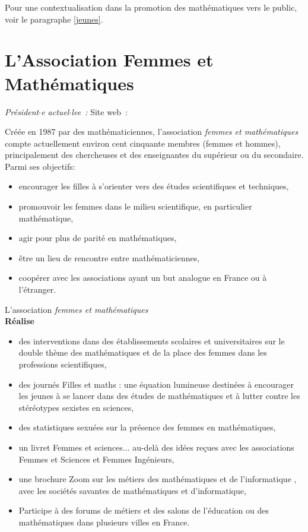 Pour une contextualisation dans la promotion des math\'ematiques vers le public, voir le paragraphe \ref{jeunes}.\\




\section{L'Association Femmes et Math\'ematiques}

\emph{Pr\'esident$\cdot$e actuel$\cdot$lee~: } \hfill Site web~: 
\smallskip

Cr\'e\'ee en 1987 par des math\'ematiciennes, l'association \textit{femmes et math\'ematiques} compte actuellement environ cent cinquante membres (femmes et hommes), principalement des chercheuses et des enseignantes du sup\'erieur ou du secondaire. \\
Parmi ses objectifs:
\begin{itemize}
\item encourager les filles \`a s'orienter vers des \'etudes scientifiques et techniques,
\item promouvoir les femmes dans le milieu scientifique, en particulier math\'ematique,
\item agir pour plus de parit\'e en math\'ematiques,
\item \^etre un lieu de rencontre entre math\'ematiciennes,
\item coop\'erer avec les associations ayant un but analogue en France ou \`a l'\'etranger.
\end{itemize}

L'association \textit{femmes et math\'ematiques} \\
\textbf{R\'ealise}
\begin{itemize}
\item  des interventions dans des \'etablissements scolaires et universitaires sur le double th\`eme des math\'ematiques et de la place des femmes dans les professions scientifiques,
\item des journ\'es \og Filles et maths : une \'equation lumineuse  \fg destin\'ees \`a encourager les jeunes \`a se lancer dans des \'etudes de math\'ematiques et \`a lutter contre les st\'er\'eotypes sexistes en sciences,
\item des statistiques sexu\'ees sur la pr\'esence des femmes en math\'ematiques,
\item un livret \og Femmes et sciences... au-del\`a des id\'ees re\c cues \fg  avec les associations Femmes et Sciences et Femmes Ing\'enieurs,
\item une brochure \og Zoom sur les m\'etiers des math\'ematiques et de l'informatique \fg, avec les soci\'et\'es savantes de math\'ematiques et d'informatique,
\item Participe \`a des forums de m\'etiers et des salons de l'\'education ou des math\'ematiques dans plusieurs villes en France.
 \end{itemize}

